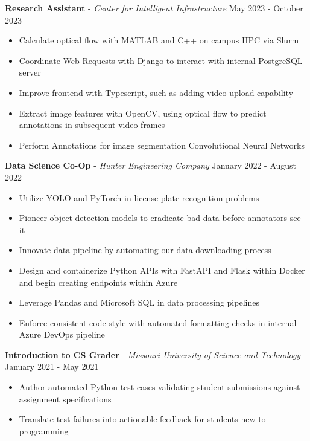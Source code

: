 \documentclass[11pt]{article}
\begin{document}
\textbf{Research Assistant} - \textsl{Center for Intelligent Infrastructure} \hfill May 2023 - October 2023
\begin{itemize}[noitemsep, topsep=0pt, partopsep=0pt, parsep=0pt, itemsep=0pt]
    \small
    \item Calculate optical flow with MATLAB and C++ on campus HPC via Slurm
    \item Coordinate Web Requests with Django to interact with internal PostgreSQL server
    \item Improve frontend with Typescript, such as adding video upload capability
    \item Extract image features with OpenCV, using optical flow to predict annotations in subsequent video frames
    \item Perform Annotations for image segmentation Convolutional Neural Networks
\end{itemize}


\textbf{Data Science Co-Op} - \textsl{Hunter Engineering Company} \hfill January 2022 - August 2022
\begin{itemize}[noitemsep, topsep=0pt, partopsep=0pt, parsep=0pt, itemsep=0pt]
    \small
    \item Utilize YOLO and PyTorch in license plate recognition problems
    \item Pioneer object detection models to eradicate bad data before annotators see it
    \item Innovate data pipeline by automating our data downloading process
    \item Design and containerize Python APIs with FastAPI and Flask within Docker and begin creating endpoints within Azure
    \item Leverage Pandas and Microsoft SQL in data processing pipelines
    \item Enforce consistent code style with automated formatting checks in internal Azure DevOps pipeline
\end{itemize}

\textbf{Introduction to CS Grader} - \textsl{Missouri University of Science and Technology} \hfill January 2021 - May 2021
\begin{itemize}[noitemsep, topsep=0pt, partopsep=0pt, parsep=0pt, itemsep=0pt]
    \small
    \item Author automated Python test cases validating student submissions against assignment specifications
    \item Translate test failures into actionable feedback for students new to programming
\end{itemize}
\end{document}
